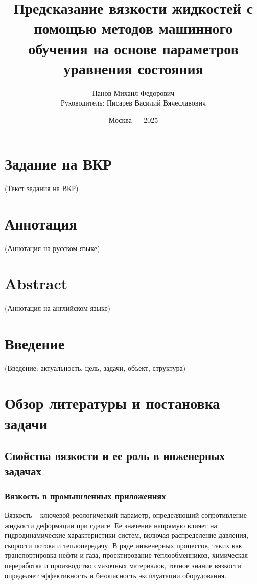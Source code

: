 \documentclass[a4paper,12pt]{article}
\title{\Huge{Предсказание вязкости жидкостей с помощью методов машинного обучения на основе параметров уравнения состояния}}
\author{Панов Михаил Федорович \\ Руководитель: Писарев Василий Вячеславович}
\date{Москва --- 2025}
\begin{document}
\maketitle
\thispagestyle{empty}
\newpage

\section*{Задание на ВКР}
(Текст задания на ВКР)

\section*{Аннотация}
(Аннотация на русском языке)

\section*{Abstract}
(Аннотация на английском языке)
\newpage

\tableofcontents
\newpage

\section*{Введение}
(Введение: актуальность, цель, задачи, объект, структура)

\section{Обзор литературы и постановка задачи}
  \subsection{Свойства вязкости и ее роль в инженерных задачах}

    \subsubsection{Вязкость в промышленных приложениях}

Вязкость -- ключевой реологический параметр, определяющий сопротивление жидкости деформации при сдвиге. Ее значение напрямую влияет на гидродинамические характеристики систем, включая распределение давления, скорости потока и теплопередачу. В ряде инженерных процессов, таких как транспортировка нефти и газа, проектирование теплообменников, химическая переработка и производство смазочных материалов, точное знание вязкости определяет эффективность и безопасность эксплуатации оборудования. 
\end{document}
